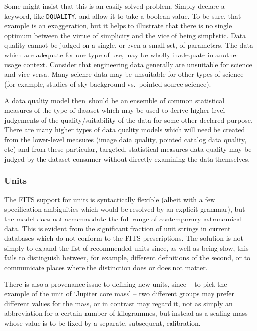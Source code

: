 \documentclass[final,authoryear,5p,times,twocolumn]{elsarticle}
\begin{document}
{{Some might insist that this is an easily solved problem. Simply
declare a keyword, like \texttt{DQUALITY}, and allow it to take a boolean
value. To be sure, that example is an exaggeration, but it helps to
illustrate that there is no single optimum between the virtue of 
simplicity and the vice of being simplistic.
Data quality cannot be judged on a single, or even a 
small set, of parameters. The
data which are adequate for one type of use, may be wholly inadequate
in another usage context. Consider that engineering data generally are
unsuitable for science and vice versa. Many science data may be
unsuitable for other types of science (for example, studies of sky
background vs.\ pointed source science).


A data quality model then, should be an ensemble of common statistical
measures of the type of dataset which may be used to derive
higher-level judgements of the quality/suitability of the data for
some other declared purpose. There are many higher types of data
quality models which will need be created from the lower-level
measures (image data quality, pointed catalog data quality, etc) and
from these particular, targeted, statistical measures data quality may
be judged by the dataset consumer without directly examining the data
themselves.


\subsubsection{Units}


The FITS support for units is syntactically flexible (albeit with
a few specification ambiguities which would be resolved by an explicit
grammar), but the model does not accommodate the full range of
contemporary astronomical data.  This is evident from the significant
fraction of unit strings in current databases which do not conform to
the FITS prescriptions.  The solution is not simply to expand the list
of recommended units since, as well as being slow, this fails to
distinguish between, for example, different definitions of the second,
or to communicate places where the distinction does or does not
matter.

There is also a provenance issue to defining new units, since -- to
pick the example of the unit of `Jupiter core mass' -- two different
groups may prefer different values for the mass, or in contrast may
regard it, not as simply an abbreviation for a certain number of
kilogrammes, but instead as a scaling mass whose value is to be fixed by a
separate, subsequent, calibration.

}}
\end{document}

